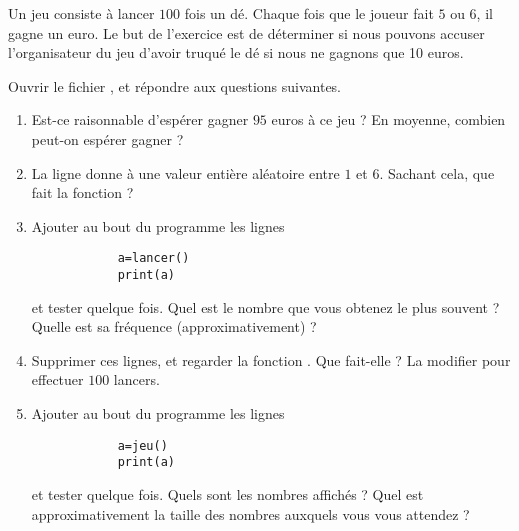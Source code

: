 
\begin{exercice}\label{exosmath-0338}

    Un jeu consiste à lancer \( 100\) fois un dé. Chaque fois que le joueur fait \( 5\) ou \( 6\), il gagne un euro. Le but de l'exercice est de déterminer si nous pouvons accuser l'organisateur du jeu d'avoir truqué le dé si nous ne gagnons que 10 euros.

    Ouvrir le fichier , et répondre aux questions suivantes.
    \begin{enumerate}
        \item
            Est-ce raisonnable d'espérer gagner \( 95\) euros à ce jeu ? En moyenne, combien peut-on espérer gagner ?
        \item

          La ligne  donne à  une valeur entière aléatoire entre \( 1\) et \( 6\). Sachant cela, que fait la fonction  ?
        \item
            Ajouter au bout du programme les lignes 
            \begin{verbatim}
            a=lancer()
            print(a)
            \end{verbatim}
            et tester quelque fois. Quel est le nombre que vous obtenez le plus souvent ? Quelle est sa fréquence (approximativement) ?
        \item
            Supprimer ces lignes, et regarder la fonction . Que fait-elle ? La modifier pour effectuer \( 100\) lancers.
        \item
            Ajouter au bout du programme les lignes 
            \begin{verbatim}
            a=jeu()
            print(a)
            \end{verbatim}
            et tester quelque fois. Quels sont les nombres affichés ? Quel est approximativement la taille des nombres auxquels vous vous attendez ?
    \end{enumerate}

\end{exercice}
